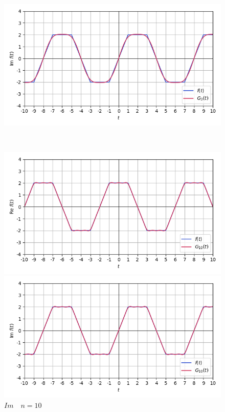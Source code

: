 \documentclass[a4paper]{article}
\begin{document}
\begin{figure}[H]
\begin{minipage}{0.5\textwidth}
        \caption{$Re\quad n = 3$}
    \end{minipage}\hfill
    \begin{minipage}{0.5\textwidth}
        \centering \includegraphics[width=\textwidth]{parametric_func/Im3.png}
        \caption{$Im\quad n = 3$}
    \end{minipage}\\[2em]
    \begin{minipage}{0.5\textwidth}
        \centering \includegraphics[width=\textwidth]{parametric_func/Re10.png}
        \caption{$Re\quad n = 10$}
    \end{minipage}\hfill
    \begin{minipage}{0.5\textwidth}
        \centering \includegraphics[width=\textwidth]{parametric_func/Im10.png}
        \caption{$Im\quad n = 10$}
    \end{minipage}
\end{figure}\noindent
\end{document}
